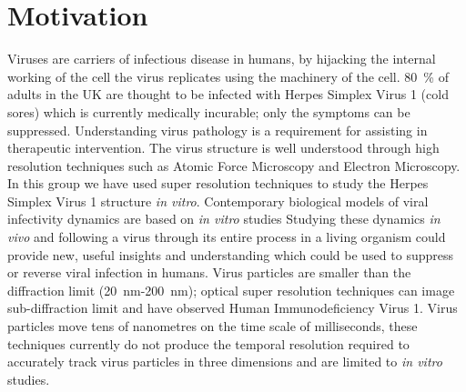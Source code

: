 \section{Motivation}
Viruses are carriers of infectious disease in humans, by hijacking the internal working of the cell the virus replicates using the machinery of the cell.
\SI{80}{\percent} of adults in the UK are thought to be infected with Herpes Simplex Virus 1 (cold sores) which is currently medically incurable\cite{Herpes}; only the symptoms can be suppressed.
Understanding virus pathology is a requirement for assisting in therapeutic intervention.
The virus structure is well understood through high resolution techniques such as Atomic Force Microscopy and Electron Microscopy.
In this group we have used super resolution techniques to study the Herpes Simplex Virus 1 structure \textit{in vitro}\cite{Laine2015}.
Contemporary biological models of viral infectivity dynamics are based on \textit{in vitro} studies %
Studying these dynamics \textit{in vivo} and following a virus through its entire process in a living organism could provide new, useful insights and understanding which could be used to suppress or reverse viral infection in humans.
Virus particles are smaller than the diffraction limit  (\SI{20}{\nano\meter}-\SI{200}{\nano\meter}); optical super resolution techniques can image sub-diffraction limit and have observed Human Immunodeficiency Virus 1\cite{Pereira2012}.
Virus particles move tens of nanometres on the time scale of milliseconds\cite{Brandenburg2007}, these techniques currently do not produce the temporal resolution required to accurately track virus particles\cite{Brandenburg2007} in three dimensions and are limited to \textit{in vitro} studies.
%
